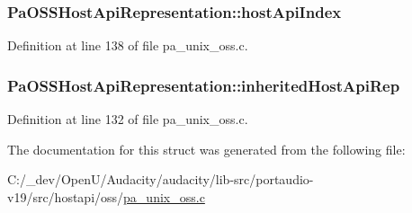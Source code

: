 \subsubsection[{\texorpdfstring{host\+Api\+Index}{hostApiIndex}}]{ Pa\+O\+S\+S\+Host\+Api\+Representation\+::host\+Api\+Index}\hypertarget{struct_pa_o_s_s_host_api_representation_adf310f504bc17e4642a1acee89379d61}{}\label{struct_pa_o_s_s_host_api_representation_adf310f504bc17e4642a1acee89379d61}


Definition at line 138 of file pa\+\_\+unix\+\_\+oss.\+c.

\subsubsection[{\texorpdfstring{inherited\+Host\+Api\+Rep}{inheritedHostApiRep}}]{ Pa\+O\+S\+S\+Host\+Api\+Representation\+::inherited\+Host\+Api\+Rep}\hypertarget{struct_pa_o_s_s_host_api_representation_ac41d15472e8618ce2a600232b1d5a898}{}\label{struct_pa_o_s_s_host_api_representation_ac41d15472e8618ce2a600232b1d5a898}


Definition at line 132 of file pa\+\_\+unix\+\_\+oss.\+c.



The documentation for this struct was generated from the following file\+:\begin{DoxyCompactItemize}
\item 
C\+:/\+\_\+dev/\+Open\+U/\+Audacity/audacity/lib-\/src/portaudio-\/v19/src/hostapi/oss/\hyperlink{pa__unix__oss_8c}{pa\+\_\+unix\+\_\+oss.\+c}\end{DoxyCompactItemize}
